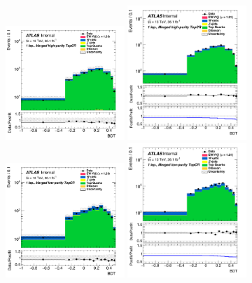 \begin{figure}[!ht]
	\centering
	\includegraphics[width=0.4\textwidth]{Chapter5/BDT_1lep_HP_CRTop_prefit.pdf}	\includegraphics[width=0.4\textwidth]{Chapter5/BDT_1lep_HP_CRTop_postfit.pdf}
	\includegraphics[width=0.4\textwidth]{Chapter5/BDT_1lep_LP_CRTop_prefit.pdf}
	\includegraphics[width=0.4\textwidth]{Chapter5/BDT_1lep_LP_CRTop_postfit.pdf}

\end{figure}
